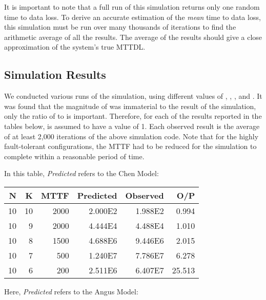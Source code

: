 \documentclass[XXX,endnotes]{usetex-v1}
\begin{document}
It is important to note that a full run of this simulation returns only one random time to data loss.  To derive an accurate estimation of the \emph{mean} time to data loss, this simulation must be run over many thousands of iterations to find the arithmetic average of all the results.  The average of the results should give a close approximation of the system's true MTTDL.

\subsection{Simulation Results}

We conducted various runs of the simulation, using different values of , , , and .  It was found that the magnitude of  was immaterial to the result of the simulation, only the ratio of  to  is important.  Therefore, for each of the results reported in the tables below,  is assumed to have a value of 1.  Each observed result is the average of at least 2,000 iterations of the above simulation code.  Note that for the highly fault-tolerant configurations, the MTTF had to be reduced for the simulation to complete within a reasonable period of time.

In this table, \emph{Predicted} refers to the Chen Model:

\begin{center}
  \begin{tabular}{ | r | r | r | r | r | r | }
    \hline
      N       & K        & MTTF     & Predicted    & Observed  & O/P         \\ \hline
      10      & 10       & 2000     & 2.000E2      & 1.988E2   & 0.994       \\ \hline
      10      & 9        & 2000     & 4.444E4      & 4.488E4   & 1.010       \\ \hline
      10      & 8        & 1500     & 4.688E6      & 9.446E6   & 2.015       \\ \hline
      10      & 7        & 500      & 1.240E7      & 7.786E7   & 6.278       \\ \hline
      10      & 6        & 200      & 2.511E6      & 6.407E7   & 25.513      \\ \hline
  \end{tabular}
\end{center}

Here, \emph{Predicted} refers to the Angus Model:
\end{document}
